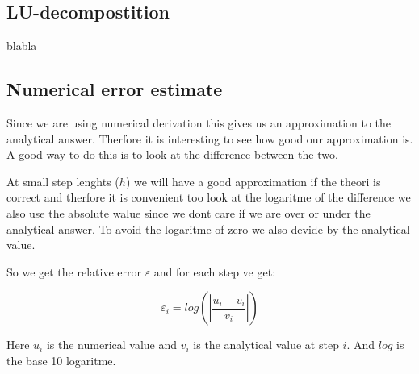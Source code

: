 \documentclass[twoside,twocolumn]{article}
\newcommand{\nl}{

\medskip
\noindent
}
\begin{document}
\subsection{LU-decompostition}
blabla \cite{linalg:lay}

\subsection{Numerical error estimate}

Since we are using numerical derivation this gives us an approximation to the analytical answer.
Therfore it is interesting to see how good our approximation is.    
A good way to do this is to look at the difference between the two.
\nl
At small step lenghts ($h$) we will have a good approximation if the theori is correct and therfore it is convenient too look at the logaritme of the difference we also use the absolute walue since we dont care if we are over or under the analytical answer. To avoid the logaritme of zero we also devide by the analytical value.
\nl
So we get the relative error $\varepsilon$ and for each step ve get:

\begin{equation}
\varepsilon_i = log\left(\left|\frac{u_i - v_i}{v_i}\right|\right)
\end{equation}

Here $u_i$ is the numerical value and $v_i$ is the analytical value at step $i$. And $log$ is the base 10 logaritme.
\end{document}
